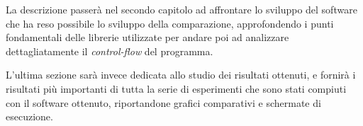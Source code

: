 La descrizione passerà nel secondo capitolo ad affrontare lo sviluppo del software che ha reso possibile lo sviluppo della comparazione, approfondendo i punti fondamentali delle librerie utilizzate per andare poi ad analizzare dettagliatamente il \textit{control-flow} del programma. 

L'ultima sezione sarà invece dedicata allo studio dei risultati ottenuti, e fornirà i risultati più importanti di tutta la serie di esperimenti che sono stati compiuti con il software ottenuto, riportandone grafici comparativi e schermate di esecuzione.

